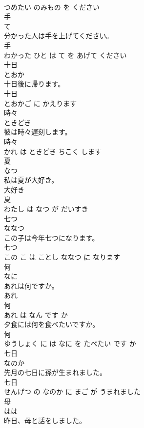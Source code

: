 \documentclass[8pt]{extreport}
\begin{document}
\begin{CJK}{UTF8}{min}
\\	つめたい のみもの を ください			
\\	手	
\\	て			
\\	分かった人は手を上げてください。	
\\	手 
\\	わかった ひと は て を あげて ください			
\\	十日	
\\	とおか			
\\	十日後に帰ります。	
\\	十日 
\\	とおかご に かえります			
\\	時々	
\\	ときどき			
\\	彼は時々遅刻します。	
\\	時々 
\\	かれ は ときどき ちこく します			
\\	夏	
\\	なつ			
\\	私は夏が大好き。	
\\	大好き 
\\	夏 
\\	わたし は なつ が だいすき			
\\	七つ	
\\	ななつ			
\\	この子は今年七つになります。	
\\	七つ 
\\	この こ は ことし ななつ に なります			
\\	何	
\\	なに			
\\	あれは何ですか。	
\\	あれ 
\\	何 
\\	あれ は なん です か			
\\	夕食には何を食べたいですか。	
\\	何 
\\	ゆうしょく に は なに を たべたい です か			
\\	七日	
\\	なのか			
\\	先月の七日に孫が生まれました。	
\\	七日 
\\	せんげつ の なのか に まご が うまれました			
\\	母	
\\	はは			
\\	昨日、母と話をしました。	

\end{CJK}
\end{document}
